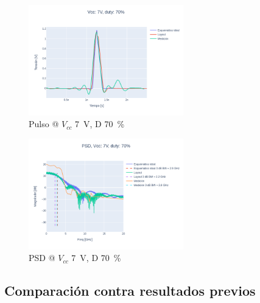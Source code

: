 \begin{figure}
  \centering
    \includegraphics[width=0.6\textwidth]{images/plots/Vcc_7V_duty_70_time_domain.png}
    \caption{Pulso @ $V_{cc}$ \qty{7}{\volt}, D \qty{70}{\percent} }
    \label{fig:plots_7v_70}
\end{figure}

\begin{figure}
  \centering
    \includegraphics[width=0.6\textwidth]{images/plots/Vcc_7V_duty_70_psd.png}
    \caption{PSD @ $V_{cc}$ \qty{7}{\volt}, D \qty{70}{\percent} }
    \label{fig:psd_7v_70}
\end{figure}

\subsection{Comparación contra resultados previos}
